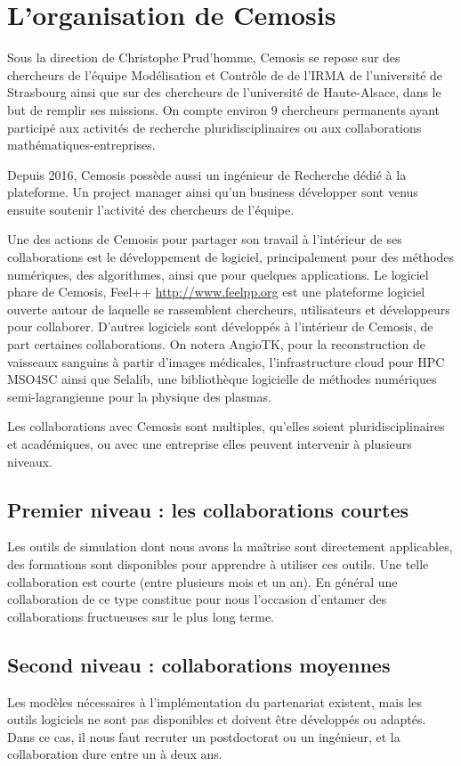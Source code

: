 \section*{L'organisation de Cemosis}

Sous la direction de Christophe Prud'homme, Cemosis se repose sur des chercheurs de l'équipe Modélisation et Contrôle de de l'IRMA de l'université de Strasbourg ainsi que sur des chercheurs de l'université de Haute-Alsace, dans le but de remplir ses missions. On compte environ 9 chercheurs permanents ayant participé aux activités de recherche pluridisciplinaires ou aux collaborations mathématiques-entreprises.

Depuis 2016, Cemosis possède aussi un ingénieur de Recherche dédié à la plateforme. Un project manager ainsi qu'un business développer sont venus ensuite	 soutenir l'activité des chercheurs de l'équipe.

Une des actions de Cemosis pour partager son travail à l'intérieur de ses collaborations est le développement de logiciel, principalement pour des méthodes numériques, des algorithmes, ainsi que pour quelques applications.
Le logiciel phare de Cemosis, Feel++ \url{http://www.feelpp.org} est une plateforme logiciel ouverte autour de laquelle se rassemblent chercheurs, utilisateurs et développeurs pour collaborer.
D'autres logiciels sont développés à l'intérieur de Cemosis, de part certaines collaborations. On notera AngioTK, pour la reconstruction de vaisseaux sanguins à partir d'images médicales, l'infrastructure cloud pour HPC MSO4SC ainsi que Selalib, une bibliothèque logicielle de méthodes numériques semi-lagrangienne pour la physique des plasmas.

Les collaborations avec Cemosis sont multiples, qu'elles soient pluridisciplinaires et académiques, ou avec une entreprise elles peuvent intervenir à plusieurs niveaux.

\subsection*{Premier niveau : les collaborations courtes}
Les outils de simulation dont nous avons la maîtrise sont directement applicables, des formations sont disponibles pour apprendre à utiliser ces outils. Une telle collaboration est courte (entre plusieurs mois et un an). En général une collaboration de ce type constitue pour nous l'occasion d'entamer des collaborations fructueuses sur le plus long terme.

\subsection*{Second niveau : collaborations moyennes}
Les modèles nécessaires à l'implémentation du partenariat existent, mais les outils logiciels ne sont pas disponibles et doivent être développés ou adaptés. Dans ce cas, il nous faut recruter un postdoctorat ou un ingénieur, et la collaboration dure entre un à deux ans.

